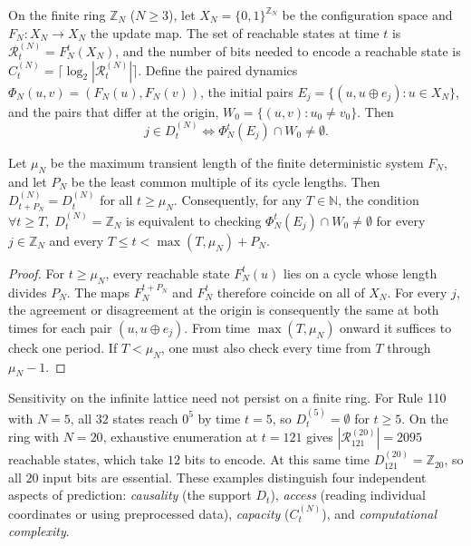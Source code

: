 On the finite ring $\mathbb{Z}_N$ ($N \ge 3$), let $X_N = \{0, 1\}^{\mathbb{Z}_N}$ be the configuration space and $F_N : X_N \to X_N$ the update map. The set of reachable states at time $t$ is $\mathcal{R}_t^{(N)} = F_N^t(X_N)$, and the number of bits needed to encode a reachable state is $C_t^{(N)} = \lceil \log_2 |\mathcal{R}_t^{(N)}| \rceil$. Define the paired dynamics $\Phi_N(u, v) = (F_N(u), F_N(v))$, the initial pairs $E_j = \{ (u, u \oplus e_j) : u \in X_N \}$, and the pairs that differ at the origin, $W_0 = \{ (u,v) : u_0 \ne v_0 \}$. Then
\begin{equation}
j \in D_t^{(N)} \iff \Phi_N^t(E_j) \cap W_0 \ne \emptyset.
\end{equation}

\begin{proposition}\label{prop:ring_cert}
Let $\mu_N$ be the maximum transient length of the finite deterministic system $F_N$, and let $P_N$ be the least common multiple of its cycle lengths. Then $D_{t+P_N}^{(N)} = D_t^{(N)}$ for all $t \ge \mu_N$. Consequently, for any $T \in \mathbb{N}$, the condition $\forall t \ge T,\; D_t^{(N)} = \mathbb{Z}_N$ is equivalent to checking $\Phi_N^t(E_j) \cap W_0 \ne \emptyset$ for every $j \in \mathbb{Z}_N$ and every $T \le t < \max(T, \mu_N) + P_N$.
\end{proposition}

\begin{proof}
For $t\ge\mu_N$, every reachable state $F_N^t(u)$ lies on a cycle whose length divides $P_N$. The maps $F_N^{t+P_N}$ and $F_N^t$ therefore coincide on all of $X_N$. For every $j$, the agreement or disagreement at the origin is consequently the same at both times for each pair $(u,u\oplus e_j)$. From time $\max(T,\mu_N)$ onward it suffices to check one period. If $T<\mu_N$, one must also check every time from $T$ through $\mu_N-1$.
\end{proof}

\begin{remark}\label{rem:ring5}
Sensitivity on the infinite lattice need not persist on a finite ring. For Rule 110 with $N = 5$, all $32$ states reach $0^5$ by time $t = 5$, so $D_t^{(5)} = \emptyset$ for $t \ge 5$. On the ring with $N = 20$, exhaustive enumeration at $t = 121$ gives $|\mathcal{R}_{121}^{(20)}| = 2095$ reachable states, which take $12$ bits to encode. At this same time $D_{121}^{(20)} = \mathbb{Z}_{20}$, so all $20$ input bits are essential. These examples distinguish four independent aspects of prediction: \emph{causality} (the support $D_t$), \emph{access} (reading individual coordinates or using preprocessed data), \emph{capacity} ($C_t^{(N)}$), and \emph{computational complexity}.
\end{remark}

